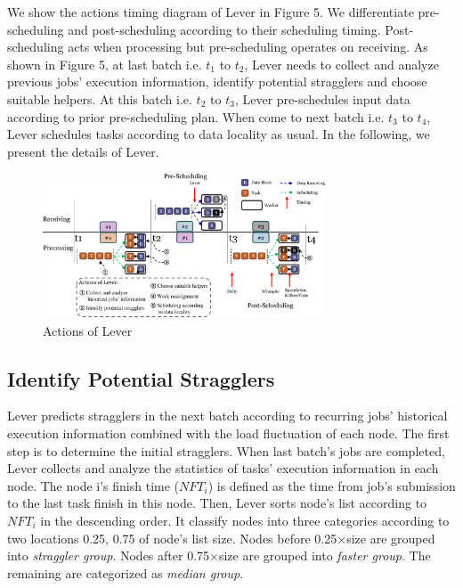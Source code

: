 \documentclass[10pt,conference,compsocconf,letterpaper]{IEEEtran}
\begin{document}
  We show the actions timing diagram of Lever in Figure 5. We differentiate pre-scheduling and post-scheduling according to their scheduling timing. Post-scheduling acts when processing but pre-scheduling operates on receiving. As shown in Figure 5, at last batch i.e. $t_1$ to $t_2$, Lever needs to collect and analyze previous jobs' execution information, identify potential stragglers and choose suitable helpers. At this batch i.e. $t_2$ to $t_3$, Lever pre-schedules input data according to prior pre-scheduling plan. When come to next batch i.e. $t_3$ to $t_4$, Lever schedules tasks according to data locality as usual. In the following, we present the details of Lever.
  \begin{figure}[htbp]
    \centering
    \includegraphics[width=0.75\textwidth]{FigureAction}
    \caption{Actions of Lever}
    \label{Fig. 5:}
  \end{figure}

\subsection{Identify Potential Stragglers}

  Lever predicts stragglers in the next batch according to recurring jobs' historical execution information combined with the load fluctuation of each node. The first step is to determine the initial stragglers. When last batch's jobs are completed, Lever collects and analyze the statistics of tasks' execution information in each node. The node i's finish time ($NFT_i$) is defined as the time from job's submission to the last task finish in this node. Then, Lever sorts node's list according to $NFT_i$ in the descending order. It classify nodes into three categories according to two locations 0.25, 0.75 of node's list size. Nodes before 0.25$\times$size are grouped into \emph{straggler group}. Nodes after 0.75$\times$size are grouped into \emph{faster group}. The remaining are categorized as \emph{median group}.
\end{document}
